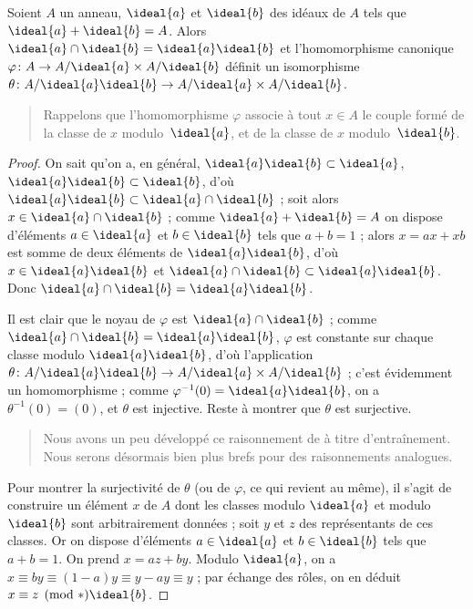 \documentclass[11pt, %
  title in boldface,
  theorem in new line,
  theorem numbering = section,
  number theorems separately,
  simple name,
]{beaulivre}
\begin{document}
    \begin{lemma}\label{lem:reste chinois;r=2}
        Soient \( A \) un anneau, \( \ideal{a} \) et \( \ideal{b} \) des idéaux de \( A \) tels que \( \ideal{a}+\ideal{b}=A \). Alors \( \ideal{a} \cap \ideal{b} = \ideal{a}\ideal{b} \) et l'homomorphisme canonique \( \varphi \colon A \to A/\ideal{a} \times A/\ideal{b} \) définit un isomorphisme \( \theta \colon A/\ideal{a}\ideal{b} \to A/\ideal{a} \times A/\ideal{b} \).
    \end{lemma}
    \begin{quote}
        Rappelons que l'homomorphisme \( \varphi \) associe à tout \( x \in A \) le couple formé de la classe de \( x \) modulo~\( \ideal{a} \), et de la classe de \( x \) modulo~\( \ideal{b} \).
    \end{quote}
    \begin{proof}
        On sait qu'on a, en général, \( \ideal{a}\ideal{b} \subset \ideal{a} \), \( \ideal{a}\ideal{b} \subset \ideal{b} \), d'où \( \ideal{a}\ideal{b} \subset \ideal{a} \cap \ideal{b} \) ; soit alors \( x \in \ideal{a} \cap \ideal{b} \) ; comme \( \ideal{a} + \ideal{b} = A \) on dispose d'éléments \( a \in \ideal{a} \) et \( b \in \ideal{b} \) tels que \( a+b = 1 \) ; alors \( x = ax+xb \) est somme de deux éléments de \( \ideal{a}\ideal{b} \), d'où \( x \in \ideal{a}\ideal{b} \) et \( \ideal{a} \cap \ideal{b} \subset \ideal{a}\ideal{b} \). Donc \( \ideal{a} \cap \ideal{b} = \ideal{a}\ideal{b} \).

        Il est clair que le noyau de \( \varphi \) est \( \ideal{a} \cap \ideal{b} \) ; comme \( \ideal{a} \cap \ideal{b} = \ideal{a}\ideal{b} \), \( \varphi \) est constante sur chaque classe modulo \( \ideal{a}\ideal{b} \), d'où l'application \( \theta \colon A/\ideal{a}\ideal{b} \to A/\ideal{a} \times A/\ideal{b} \) ; c'est évidemment un homomorphisme ; comme \( \varphi^{-1}(0) = \ideal{a}\ideal{b} \), on a \( \theta^{-1}(0) = (0) \), et \( \theta \) est injective. Reste à montrer que \( \theta \) est surjective.

        \begin{quote}
            Nous avons un peu développé ce raisonnement de  à titre d'entraînement. Nous serons désormais bien plus brefs pour des raisonnements analogues.
        \end{quote}

        Pour montrer la surjectivité de \( \theta \) (ou de \( \varphi \), ce qui revient au même), il s'agit de construire un élément \( x \) de \( A \) dont les classes modulo \( \ideal{a} \) et modulo \( \ideal{b} \) sont arbitrairement données ; soit \( y \) et \( z \) des représentants de ces classes. Or on dispose d'éléments \( a \in \ideal{a} \) et \( b \in \ideal{b} \) tels que \( a+b = 1 \). On prend \( x = az+by \). Modulo \( \ideal{a} \), on a \( x \equiv by \equiv (1-a)y \equiv y-ay \equiv y \) ; par échange des rôles, on en déduit \( x \equiv z \pmod*{\ideal{b}} \).
    \end{proof}
\end{document}
